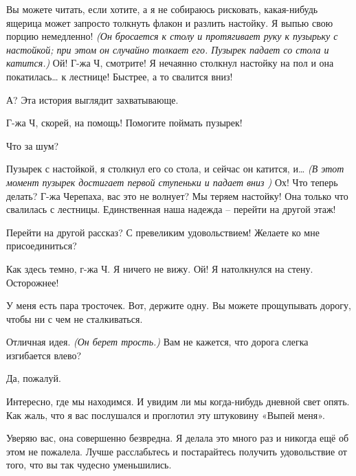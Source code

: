 \documentclass[../main.tex]{subfiles}
\begin{document}
\begin{Dialogue}
\begin{sublevel}
\begin{sublevel}
 Вы можете читать, если хотите, а я не собираюсь рисковать, какая-нибудь ящерица может запросто толкнуть флакон и разлить настойку. Я выпью свою порцию немедленно! \emph{(Он бросается к столу и протягивает руку к пузырьку с настойкой; при этом он случайно толкает его. Пузырек падает со стола и катится.)} Ой! Г-жа Ч, смотрите! Я нечаянно столкнул настойку на пол и она покатилась\ldots{} к лестнице! Быстрее, а то свалится вниз!


 А? Эта история выглядит захватывающе.

 Г-жа Ч, скорей, на помощь! Помогите поймать пузырек!

 Что за шум?

 Пузырек с настойкой, я столкнул его со стола, и сейчас он катится, и\ldots{} \emph{(В этот момент пузырек достигает первой ступеньки и падает вниз )} Ох! Что теперь делать? Г-жа Черепаха, вас это не волнует? Мы теряем настойку! Она только что свалилась с лестницы. Единственная наша надежда \--- перейти на другой этаж!

 Перейти на другой рассказ? С превеликим удовольствием! Желаете ко мне присоединиться?



\begin{sublevel}


 Как здесь темно, г-жа Ч\@. Я ничего не вижу. Ой! Я натолкнулся на стену. Осторожнее!

 У меня есть пара тросточек. Вот, держите одну. Вы можете прощупывать дорогу, чтобы ни с чем не сталкиваться.

 Отличная идея. \emph{(Он берет трость.)} Вам не кажется, что дорога слегка изгибается влево?

 Да, пожалуй.

 Интересно, где мы находимся. И увидим ли мы когда-нибудь дневной свет опять. Как жаль, что я вас послушался и проглотил эту штуковину «Выпей меня».

 Уверяю вас, она совершенно безвредна. Я делала это много раз и никогда ещё об этом не пожалела. Лучше расслабьтесь и постарайтесь получить удовольствие от того, что вы так чудесно уменьшились.


\end{sublevel}
\end{sublevel}
\end{sublevel}
\end{Dialogue}
\end{document}
